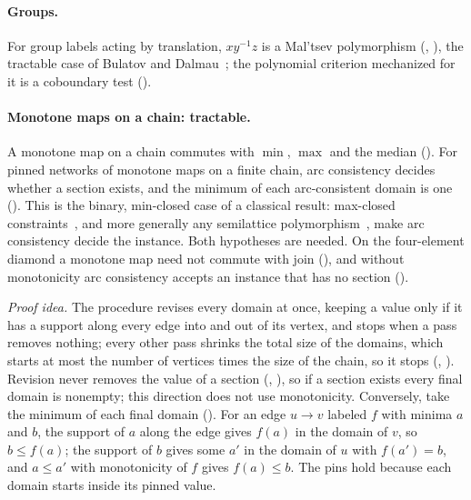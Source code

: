 \paragraph{Groups.} For group labels acting by translation, $x y^{-1} z$ is a Mal'tsev polymorphism
(, ), the tractable case of Bulatov and Dalmau~\cite{bulatov2006};
the polynomial criterion mechanized for it is a coboundary test ().

\paragraph{Monotone maps on a chain: tractable.} A monotone map on a chain commutes with $\min$,
$\max$ and the median (). For pinned networks of monotone maps on a finite chain, arc
consistency decides whether a section exists, and the minimum of each arc-consistent domain is one
(). This is the binary, min-closed case of a classical result: max-closed
constraints~\cite{jeavons1995}, and more generally any semilattice polymorphism~\cite{jeavons1997},
make arc consistency decide the instance. Both hypotheses are needed. On the four-element diamond a
monotone map need not commute with join (), and without monotonicity arc
consistency accepts an instance that has no section ().

\emph{Proof idea.} The procedure revises every domain at once, keeping a value only if it has a
support along every edge into and out of its vertex, and stops when a pass removes nothing; every
other pass shrinks the total size of the domains, which starts at most the number of vertices times
the size of the chain, so it stops (, ). Revision never removes the value of a
section (, ), so if a section exists every final domain is nonempty; this
direction does not use monotonicity. Conversely, take the minimum of each final domain
(). For an edge $u \to v$ labeled $f$ with minima $a$ and $b$, the support of $a$
along the edge gives $f(a)$ in the domain of $v$, so $b \le f(a)$; the support of $b$ gives some $a'$
in the domain of $u$ with $f(a') = b$, and $a \le a'$ with monotonicity of $f$ gives $f(a) \le b$.
The pins hold because each domain starts inside its pinned value.

